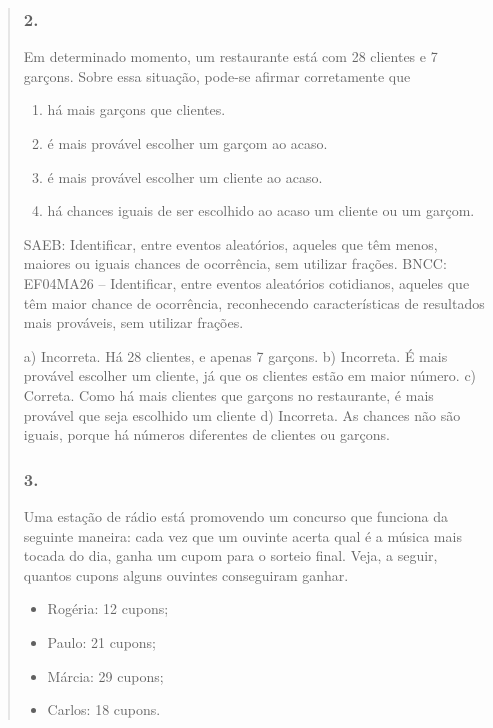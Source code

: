 \begin{enumerate}
\begin{escolha}
\begin{enumerate}
\begin{itemize}
\begin{itemize}
\begin{escolha}
\begin{quote}
\begin{escolha}
\subsubsection{2.}\label{section-89}

Em determinado momento, um restaurante está com 28 clientes e 7
garçons. Sobre essa situação, pode-se afirmar corretamente que

\begin{enumerate}
\def\labelenumi{\alph{enumi})}
\item
  há mais garçons que clientes.
\item
  é mais provável escolher um garçom ao acaso.
\item
  é mais provável escolher um cliente ao acaso.
\item
  há chances iguais de ser escolhido ao acaso um cliente ou um garçom.
\end{enumerate}

SAEB: Identificar, entre eventos aleatórios, aqueles que têm menos, maiores ou iguais chances de ocorrência, sem utilizar frações.
BNCC: EF04MA26 -- Identificar, entre eventos aleatórios cotidianos, aqueles que têm maior chance de
ocorrência, reconhecendo características de resultados mais prováveis, sem utilizar frações.

a) Incorreta. Há 28 clientes, e apenas 7 garçons.
b) Incorreta. É mais provável escolher um cliente, já que os clientes estão em maior número.
c) Correta. Como há mais clientes que garçons no restaurante, é mais provável que seja escolhido um cliente
d) Incorreta. As chances não são iguais, porque há números diferentes de clientes ou garçons.

\subsubsection{3.}\label{section-90}

Uma estação de rádio está promovendo um concurso que funciona da seguinte maneira: cada vez que um ouvinte acerta qual é a música mais tocada do dia, ganha um cupom para o sorteio final. Veja, a seguir, quantos cupons alguns ouvintes conseguiram ganhar.

\begin{itemize}
  \item Rogéria: 12 cupons;
  \item Paulo: 21 cupons;
  \item Márcia: 29 cupons;
  \item Carlos: 18 cupons.
\end{itemize}


\end{escolha}
\end{quote}
\end{escolha}
\end{itemize}
\end{itemize}
\end{enumerate}
\end{escolha}
\end{enumerate}
